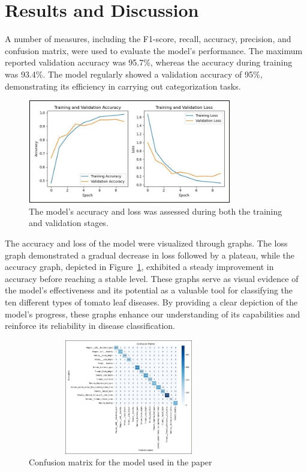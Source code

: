 \documentclass[conference]{IEEEtran}
\begin{document}
\section{Results and Discussion}

A number of measures, including the F1-score, recall, accuracy, precision, and confusion matrix, were used to evaluate the model's performance. The maximum reported validation accuracy was 95.7\%, whereas the accuracy during training was 93.4\%. The model regularly showed a validation accuracy of 95\%, demonstrating its efficiency in carrying out categorization tasks.

 \begin{figure}[H]
 \includegraphics[width=8.9cm, height=4.5cm]{accuracy.jpg}
\caption{The model's accuracy  and loss was assessed during both the training and validation stages.}
\label{fig: Figure 3}
\end{figure}

The accuracy and loss of the model were visualized through graphs. The loss graph demonstrated a gradual decrease in loss followed by a plateau, while the accuracy graph, depicted in Figure~\ref{fig: Figure 3}, exhibited a steady improvement in accuracy before reaching a stable level. These graphs serve as visual evidence of the model's effectiveness and its potential as a valuable tool for classifying the ten different types of tomato leaf diseases. By providing a clear depiction of the model's progress, these graphs enhance our understanding of its capabilities and reinforce its reliability in disease classification.


 \begin{figure}[H]
 \includegraphics[width=8.8cm, height=5cm]{confusion.jpg}
\caption{Confusion matrix for the model used in the paper}
\label{fig: Figure 4}
\end{figure}
\end{document}
